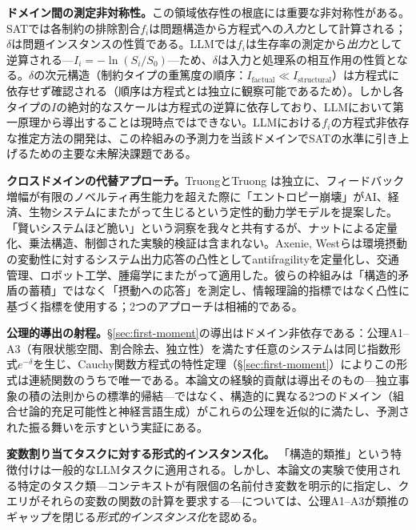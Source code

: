 \documentclass[11pt,a4paper]{article}
\begin{document}
\textbf{ドメイン間の測定非対称性。}この領域依存性の根底には重要な非対称性がある。SATでは各制約の排除割合$f_i$は問題構造から方程式への\emph{入力}として計算される；$\delta$は問題インスタンスの性質である。LLMでは$f_i$は生存率の測定から\emph{出力}として逆算される---$I_i = -\ln(S_i/S_0)$---ため、$\delta$は入力と処理系の相互作用の性質となる。$\delta$の次元構造（制約タイプの重篤度の順序：$I_{\text{factual}} \ll I_{\text{structural}}$）は方程式に依存せず確認される（順序は方程式とは独立に観察可能であるため）。しかし各タイプの$I$の絶対的なスケールは方程式の逆算に依存しており、LLMにおいて第一原理から導出することは現時点ではできない。LLMにおける$f_i$の方程式非依存な推定方法の開発は、この枠組みの予測力を当該ドメインでSATの水準に引き上げるための主要な未解決課題である。

\textbf{クロスドメインの代替アプローチ。}TruongとTruong \cite{truong2025entropy}は独立に、フィードバック増幅が有限のノベルティ再生能力を超えた際に「エントロピー崩壊」がAI、経済、生物システムにまたがって生じるという定性的動力学モデルを提案した。「賢いシステムほど脆い」という洞察を我々と共有するが、ナットによる定量化、乗法構造、制御された実験的検証は含まれない。Axenie, Westら\cite{axenie2024antifragility}は環境摂動の変動性に対するシステム出力応答の凸性としてantifragilityを定量化し、交通管理、ロボット工学、腫瘍学にまたがって適用した。彼らの枠組みは「構造的矛盾の蓄積」ではなく「摂動への応答」を測定し、情報理論的指標ではなく凸性に基づく指標を使用する；2つのアプローチは相補的である。

\textbf{公理的導出の射程。}\S\ref{sec:first-moment}の導出はドメイン非依存である：公理A1--A3（有限状態空間、割合除去、独立性）を満たす任意のシステムは同じ指数形式$e^{-\delta}$を生じ、Cauchy関数方程式の特性定理（\S\ref{sec:first-moment}）によりこの形式は連続関数のうちで唯一である。本論文の経験的貢献は導出そのもの---独立事象の積の法則からの標準的帰結---ではなく、構造的に異なる2つのドメイン（組合せ論的充足可能性と神経言語生成）がこれらの公理を近似的に満たし、予測された振る舞いを示すという実証にある。

\textbf{変数割り当てタスクに対する形式的インスタンス化。}\label{sec:formal-instantiation}
「構造的類推」という特徴付けは一般的なLLMタスクに適用される。しかし、本論文の実験で使用される特定のタスク類---コンテキストが有限個の名前付き変数を明示的に指定し、クエリがそれらの変数の関数の計算を要求する---については、公理A1--A3が類推のギャップを閉じる\emph{形式的インスタンス化}を認める。
\end{document}
